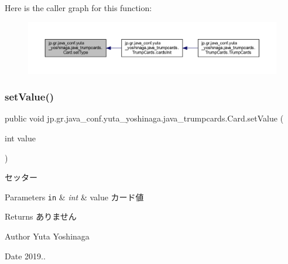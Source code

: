Here is the caller graph for this function\+:
\nopagebreak
\begin{figure}[H]
\begin{center}
\leavevmode
\includegraphics[width=350pt]{classjp_1_1gr_1_1java__conf_1_1yuta__yoshinaga_1_1java__trumpcards_1_1_card_a23261f01f6e562e720b5cf55919f1342_icgraph}
\end{center}
\end{figure}
\mbox{\label{classjp_1_1gr_1_1java__conf_1_1yuta__yoshinaga_1_1java__trumpcards_1_1_card_a64976287ff631099e8cde6717b1611c6}} 
\subsubsection{\texorpdfstring{set\+Value()}{setValue()}}
{\footnotesize\ttfamily public void jp.\+gr.\+java\+\_\+conf.\+yuta\+\_\+yoshinaga.\+java\+\_\+trumpcards.\+Card.\+set\+Value (\begin{DoxyParamCaption}\item[{int}]{value }\end{DoxyParamCaption})}



セッター 


\begin{DoxyParams}[1]{Parameters}
\mbox{\tt in}  & {\em int} & value カード値 \\
\hline
\end{DoxyParams}
\begin{DoxyReturn}{Returns}
ありません 
\end{DoxyReturn}
\begin{DoxyAuthor}{Author}
Yuta Yoshinaga 
\end{DoxyAuthor}
\begin{DoxyDate}{Date}
2019.. 
\end{DoxyDate}


